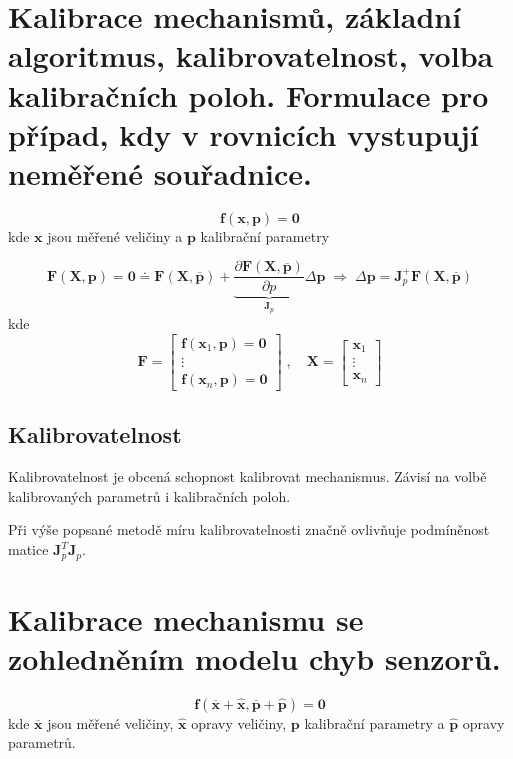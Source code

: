 \documentclass{article}
\begin{document}
	\section{Kalibrace mechanismů, základní algoritmus, kalibrovatelnost, volba kalibračních poloh. Formulace pro případ, kdy v rovnicích vystupují neměřené souřadnice.}

	\begin{equation}
		\bm{f}(\bm{x},\bm{p}) = \bm{0}
	\end{equation}
	kde $\bm{x}$ jsou měřené veličiny a $\bm{p}$ kalibrační parametry

	\begin{equation}
		\bm{F}(\bm{X},\bm{p})
		=
		\bm{0} \doteq \bm{F}(\bm{X},\bm{\overline{p}})
		+
		\underbrace{\frac{\partial \bm{F}(\bm{X},\bm{\overline{p}})}{\partial p}}_{\bm{J}_p} \Delta\bm{p}
		\;\Rightarrow\;
		\Delta\bm{p} = \bm{J}_p^+ \bm{F}(\bm{X},\bm{\overline{p}})
	\end{equation}
	kde
	\begin{equation}
		\bm{F}
		=
		\begin{bmatrix}
			\bm{f}(\bm{x}_1,\bm{p}) = \bm{0} \\
			\vdots \\
			\bm{f}(\bm{x}_n,\bm{p}) = \bm{0}
		\end{bmatrix}
		\;,\quad 
		\bm{X}
		=
		\begin{bmatrix}
			\bm{x}_1 \\
			\vdots \\
			\bm{x}_n
		\end{bmatrix}
	\end{equation}

	\subsection*{Kalibrovatelnost}

	Kalibrovatelnost je obcená schopnost kalibrovat mechanismus. Závisí na volbě kalibrovaných parametrů i kalibračních poloh.

	Při výše popsané metodě míru kalibrovatelnosti značně ovlivňuje podmíněnost matice $\bm{J}_p^T \bm{J}_p$.

	\section{Kalibrace mechanismu se zohledněním modelu chyb senzorů.}
	\begin{equation}
		\bm{f}(\bm{\overline{x}}+\bm{\hat{x}},\bm{\overline{p}}+\bm{\hat{p}}) = \bm{0}
	\end{equation}
	kde $\bm{\overline{x}}$ jsou měřené veličiny, $\bm{\hat{x}}$ opravy veličiny, $\bm{p}$ kalibrační parametry a $\bm{\hat{p}}$ opravy parametrů.
\end{document}
